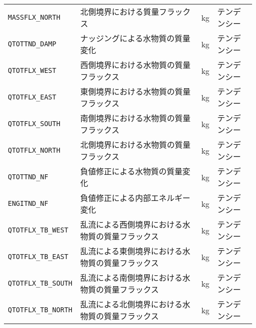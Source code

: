 \begin{longtable}{|l|l|l|l|}
      \verb|MASSFLX_NORTH| & 北側境界における質量フラックス           & kg & テンデンシー \\
      \verb|QTOTTND_DAMP|  & ナッジングによる水物質の質量変化           & kg & テンデンシー \\
      \verb|QTOTFLX_WEST|  & 西側境界における水物質の質量フラックス     & kg & テンデンシー \\
      \verb|QTOTFLX_EAST|  & 東側境界における水物質の質量フラックス     & kg & テンデンシー \\
      \verb|QTOTFLX_SOUTH| & 南側境界における水物質の質量フラックス     & kg & テンデンシー \\
      \verb|QTOTFLX_NORTH| & 北側境界における水物質の質量フラックス     & kg & テンデンシー \\
      \verb|QTOTTND_NF|       & 負値修正による水物質の質量変化              & kg & テンデンシー \\
      \verb|ENGITND_NF|       & 負値修正による内部エネルギー変化             & kg & テンデンシー \\
      \verb|QTOTFLX_TB_WEST|  & 乱流による西側境界における水物質の質量フラックス & kg & テンデンシー \\
      \verb|QTOTFLX_TB_EAST|  & 乱流による東側境界における水物質の質量フラックス & kg & テンデンシー \\
      \verb|QTOTFLX_TB_SOUTH| & 乱流による南側境界における水物質の質量フラックス & kg & テンデンシー \\
      \verb|QTOTFLX_TB_NORTH| & 乱流による北側境界における水物質の質量フラックス & kg & テンデンシー \\
\end{longtable}

